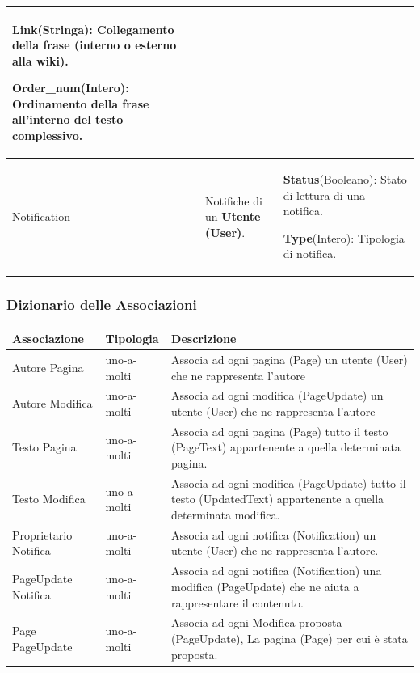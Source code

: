 \documentclass{article}
\begin{document}
{\begin{table}[H]
\begin{tabularx}{\textwidth}{|l|X|X|}
			\textbf{Link}(Stringa): Collegamento della frase (interno o esterno alla wiki).

			\textbf{Order\_num}(Intero): Ordinamento della frase all'interno del testo complessivo.
			\\
			\hline
			Notification & Notifiche di un \textbf{Utente (User)}.& 
		    \textbf{Status}(Booleano): Stato di lettura di una notifica.
		    
		    \textbf{Type}(Intero): Tipologia di notifica.
			\\
			\hline

		\end{tabularx}
		
	\end{table}
	
	{\subsubsection{Dizionario delle Associazioni}}
	
	\begin{table}[H]
		\centering
		\small %
		\setlength{\tabcolsep}{6pt} %
		\renewcommand{\arraystretch}{1.2} %
		
		
		\begin{tabularx}{\textwidth}{|l|l|X|}
			\hline
			\textbf{Associazione} &\textbf{Tipologia}  & \textbf{Descrizione} \\
			\hline
			Autore Pagina & uno-a-molti  & Associa ad ogni pagina (Page) un utente (User) che ne rappresenta l'autore
			\\
			\hline
			Autore Modifica & uno-a-molti  & Associa ad ogni modifica (PageUpdate) un utente (User) che ne rappresenta l'autore
			\\
			\hline
			Testo Pagina & uno-a-molti  & Associa ad ogni pagina (Page) tutto il testo (PageText) appartenente a quella determinata pagina.
			\\
			\hline
			Testo Modifica & uno-a-molti  & Associa ad ogni modifica (PageUpdate) tutto il testo (UpdatedText) appartenente a quella determinata modifica.
			\\
			\hline
			Proprietario Notifica & uno-a-molti  & Associa ad ogni notifica (Notification) un utente (User) che ne rappresenta l'autore.
			\\
			\hline
			PageUpdate Notifica & uno-a-molti  & Associa ad ogni notifica (Notification) una modifica (PageUpdate) che ne aiuta a rappresentare il contenuto.
			\\
			\hline
			Page PageUpdate & uno-a-molti  & Associa ad ogni Modifica proposta (PageUpdate), La pagina (Page) per cui \`e stata proposta. 
			\\
			\hline
		\end{tabularx}
		

\end{table}}
\end{document}
